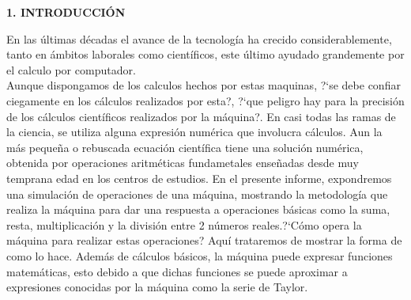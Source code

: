 \documentclass[10pt,a4paper]{article}
\begin{document}
\begin{multicols}{2}
\begin{center}
{\large \bf 1. INTRODUCCI\'ON}
\end{center}
En las \'ultimas d\'ecadas el avance de la tecnolog\'ia ha crecido considerablemente, tanto en \'ambitos laborales como cient\'ificos, este \'ultimo ayudado grandemente por el calculo por computador.\\
Aunque dispongamos de los calculos hechos por estas maquinas, ?`se debe confiar ciegamente en los c\'alculos realizados por esta?, ?`que peligro hay para la precisi\'on de los c\'alculos cient\'ificos realizados por la m\'aquina?. En casi todas las ramas de la ciencia, se utiliza alguna expresi\'on num\'erica que involucra c\'alculos. Aun la m\'as peque\~na o rebuscada ecuaci\'on cient\'ifica tiene una soluci\'on num\'erica, obtenida por operaciones aritm\'eticas fundametales ense\~nadas desde muy temprana edad en los centros de estudios. En el presente informe, expondremos una simulaci\'on de operaciones de una m\'aquina, mostrando la metodolog\'ia que realiza la m\'aquina para dar una respuesta a operaciones b\'asicas como la suma, resta, multiplicaci\'on y la divisi\'on entre 2 n\'umeros reales.?`C\'omo opera la m\'aquina para realizar estas operaciones? Aqu\'i trataremos de mostrar la forma de como lo hace. Adem\'as de c\'alculos b\'asicos, la m\'aquina puede expresar funciones matem\'aticas, esto debido a que dichas funciones se puede aproximar a expresiones conocidas por la m\'aquina como la serie de Taylor. 


\end{multicols}
\end{document}
